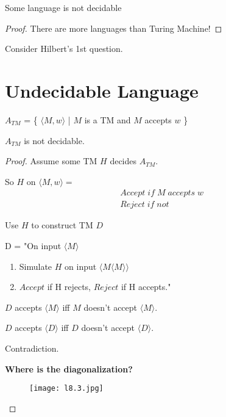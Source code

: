 \begin{corollary}
    Some language is not decidable 
\end{corollary}
\begin{proof}
    There are more languages than Turing Machine! 
\end{proof}

\begin{remark}
    Consider Hilbert's 1st question.
\end{remark}

\section{Undecidable Language}
\begin{theorem}\label{theorem: undecidable language}
    \(A_{TM}\) = \{ \(\langle M, w \rangle\) | \(M\) is a TM and \(M\) accepts \(w\)  \} 

    \(A_{TM}\) is not decidable. 
\end{theorem}
\begin{proof}
    Assume some TM \(H\) decides \(A_{TM}\).  

    So \(H\) on \(\langle M, w \rangle = \) \begin{align*}
        & Accept \; if \; M \;accepts \;w\\
        & Reject \; if \; not
    \end{align*} 

    Use \(H\) to construct TM \(D\)  

    D = "On input \(\langle M \rangle \)
        \begin{enumerate}
            \item Simulate \(H\) on input \(\langle M \langle M \rangle \rangle \)
            \item \(Accept\) if H rejects, \(Reject\) if H accepts."    
        \end{enumerate} 

    \(D\) accepts \(\langle M \rangle \) iff \(M\) doesn't accept \(\langle M \rangle\).    

    \(D\) accepts \(\langle D \rangle \) iff \(D\) doesn't accept \(\langle D \rangle\).    

    Contradiction.
    \hfill\break

    \textbf{Where is the diagonalization?}
    \begin{figure}[H]
    \centering
    \texttt{[image: l8.3.jpg]}
    \caption{}
    \end{figure}
\end{proof}

